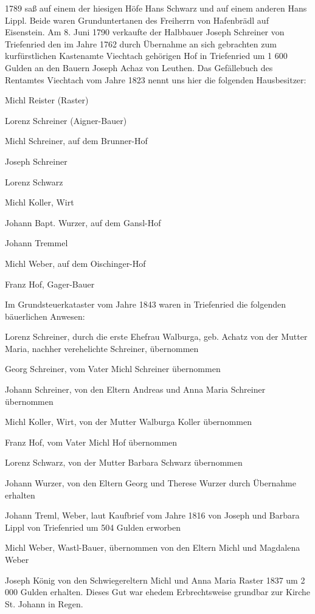 \documentclass[12pt,a4pager]{book}
\begin{document}
1789 saß auf einem der hiesigen Höfe Hans Schwarz und auf einem anderen Hans
Lippl. Beide waren Grunduntertanen des Freiherrn von Hafenbrädl auf Eisenstein.
Am 8. Juni 1790 verkaufte der Halbbauer Joseph Schreiner von Triefenried den im
Jahre 1762 durch Übernahme an sich gebrachten zum kurfürstlichen Kastenamte
Viechtach gehörigen Hof in Triefenried um 1 600 Gulden an den Bauern Joseph
Achaz von Leuthen. Das Gefällebuch des Rentamtes Viechtach vom Jahre 1823 nennt
uns hier die folgenden Hausbesitzer:

\begin{compactitem}
\item Michl Reister (Raster)
\item Lorenz Schreiner (Aigner-Bauer)
\item Michl Schreiner, auf dem Brunner-Hof
\item Joseph Schreiner
\item Lorenz Schwarz
\item Michl Koller, Wirt
\item Johann Bapt. Wurzer, auf dem Gansl-Hof
\item Johann Tremmel
\item Michl Weber, auf dem Oischinger-Hof
\item Franz Hof, Gager-Bauer
\end{compactitem}

Im Grundsteuerkataster vom Jahre 1843 waren in Triefenried die folgenden
bäuerlichen Anwesen:

\begin{compactitem}
\item Lorenz Schreiner, durch die erste Ehefrau Walburga, geb. Achatz von der
Mutter Maria, nachher verehelichte Schreiner, übernommen
\item Georg Schreiner, vom Vater Michl Schreiner übernommen
\item Johann Schreiner, von den Eltern Andreas und Anna Maria Schreiner
übernommen
\item Michl Koller, Wirt, von der Mutter Walburga Koller übernommen
\item Franz Hof, vom Vater Michl Hof übernommen
\item Lorenz Schwarz, von der Mutter Barbara Schwarz übernommen
\item Johann Wurzer, von den Eltern Georg und Therese Wurzer durch Übernahme
erhalten
\item Johann Treml, Weber, laut Kaufbrief vom Jahre 1816 von Joseph und Barbara
Lippl von Triefenried um 504 Gulden erworben
\item Michl Weber, Wastl-Bauer, übernommen von den Eltern Michl und Magdalena
Weber
\item Joseph König von den Schwiegereltern Michl und Anna Maria Raster 1837 um 2
000 Gulden erhalten. Dieses Gut war ehedem Erbrechtsweise grundbar zur Kirche
St. Johann in Regen.
\end{compactitem}
\end{document}
